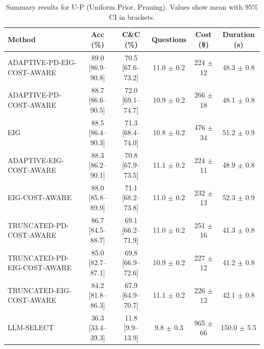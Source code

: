 \begin{table}[htbp]
\centering
\small
\caption{Summary results for U-P (Uniform Prior, Pruning). Values show mean with 95\% CI in brackets.}
\label{tab:results-prune_uniform}
\begin{tabular}{@{}lccccc@{}}
\toprule
Method & Acc (\%) & C\&C (\%) & Questions & Cost (\$) & Duration (s) \\
\midrule
ADAPTIVE-PD-EIG-COST-AWARE & 89.0 [86.9--90.8] & 70.5 [67.6--73.2] & 11.0 $\pm$ 0.2 & 224 $\pm$ 12 & 48.3 $\pm$ 0.8 \\
ADAPTIVE-PD-COST-AWARE & 88.7 [86.6--90.5] & 72.0 [69.1--74.7] & 10.9 $\pm$ 0.2 & 266 $\pm$ 18 & 48.1 $\pm$ 0.8 \\
EIG & 88.5 [86.4--90.3] & 71.3 [68.4--74.0] & 10.8 $\pm$ 0.2 & 476 $\pm$ 34 & 51.2 $\pm$ 0.9 \\
ADAPTIVE-EIG-COST-AWARE & 88.3 [86.2--90.1] & 70.8 [67.9--73.5] & 11.1 $\pm$ 0.2 & 224 $\pm$ 11 & 48.9 $\pm$ 0.8 \\
EIG-COST-AWARE & 88.0 [85.8--89.9] & 71.1 [68.2--73.8] & 11.0 $\pm$ 0.2 & 232 $\pm$ 13 & 52.3 $\pm$ 0.9 \\
TRUNCATED-PD-COST-AWARE & 86.7 [84.5--88.7] & 69.1 [66.2--71.9] & 11.0 $\pm$ 0.2 & 251 $\pm$ 16 & 41.3 $\pm$ 0.8 \\
TRUNCATED-PD-EIG-COST-AWARE & 85.0 [82.7--87.1] & 69.8 [66.9--72.6] & 10.9 $\pm$ 0.2 & 227 $\pm$ 12 & 41.2 $\pm$ 0.8 \\
TRUNCATED-EIG-COST-AWARE & 84.2 [81.8--86.3] & 67.9 [64.9--70.7] & 11.1 $\pm$ 0.2 & 226 $\pm$ 12 & 42.1 $\pm$ 0.8 \\
LLM-SELECT & 36.3 [33.4--39.3] & 11.8 [9.9--13.9] & 9.8 $\pm$ 0.3 & 965 $\pm$ 66 & 150.0 $\pm$ 5.5 \\
\bottomrule
\end{tabular}
\end{table}